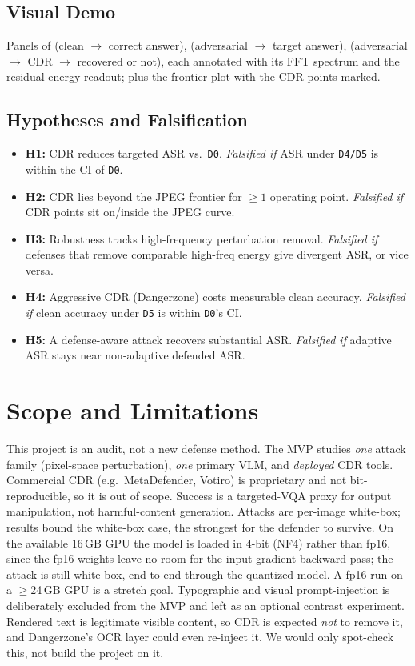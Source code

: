 \documentclass[11pt]{article}
\begin{document}
\subsection{Visual Demo}
Panels of (clean $\to$ correct answer), (adversarial $\to$ target answer),
(adversarial $\to$ CDR $\to$ recovered or not), each annotated with its FFT
spectrum and the residual-energy readout; plus the frontier plot with the CDR
points marked.

\subsection{Hypotheses and Falsification}
\begin{itemize}
\item \textbf{H1:} CDR reduces targeted ASR vs.\ \texttt{D0}.
      \emph{Falsified if} ASR under \texttt{D4/D5} is within the CI of \texttt{D0}.
\item \textbf{H2:} CDR lies beyond the JPEG frontier for $\geq 1$ operating point.
      \emph{Falsified if} CDR points sit on/inside the JPEG curve.
\item \textbf{H3:} Robustness tracks high-frequency perturbation removal.
      \emph{Falsified if} defenses that remove comparable high-freq energy give
      divergent ASR, or vice versa.
\item \textbf{H4:} Aggressive CDR (Dangerzone) costs measurable clean accuracy.
      \emph{Falsified if} clean accuracy under \texttt{D5} is within \texttt{D0}'s CI.
\item \textbf{H5:} A defense-aware attack recovers substantial ASR.
      \emph{Falsified if} adaptive ASR stays near non-adaptive defended ASR.
\end{itemize}

\section{Scope and Limitations}
This project is an audit, not a new defense method. The MVP studies
\emph{one} attack family (pixel-space perturbation), \emph{one} primary VLM, and
\emph{deployed} CDR tools. Commercial CDR (e.g.\ MetaDefender, Votiro) is
proprietary and not bit-reproducible, so it is out of scope.
Success is a targeted-VQA proxy for output manipulation, not harmful-content
generation. Attacks are per-image white-box; results bound the white-box case,
the strongest for the defender to survive. On the available 16\,GB GPU the model
is loaded in 4-bit (NF4) rather than fp16, since the fp16 weights leave no room
for the input-gradient backward pass; the attack is still white-box, end-to-end
through the quantized model. A fp16 run on a $\geq$24\,GB GPU is a stretch goal. Typographic and visual
prompt-injection is deliberately excluded from the MVP and left as an optional
contrast experiment. Rendered text is legitimate visible content, so CDR is
expected \emph{not} to remove it, and Dangerzone's OCR layer could even
re-inject it. We would only spot-check this, not build the project on it.
\end{document}
